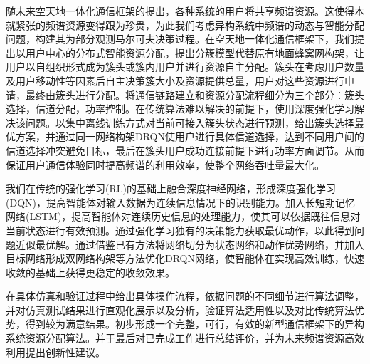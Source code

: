 \begin{cabstract}

随未来空天地一体化通信框架的提出，各种系统的用户将共享频谱资源。这使得本就紧张的频谱资源变得跟为珍贵，为此我们考虑异构系统中频谱的动态与智能分配问题，构建其为部分观测马尔可夫决策过程。在空天地一体化通信框架下，我们提出以用户中心的分布式智能资源分配，提出分簇模型代替原有地面蜂窝网构架，让用户以自组织形式成为簇头或簇内用户并进行资源自主分配。簇头在考虑用户数量及用户移动性等因素后自主决策簇大小及资源提供总量，用户对这些资源进行申请，最终由簇头进行分配。将通信链路建立和资源分配流程细分为三个部分：簇头选择，信道分配，功率控制。在传统算法难以解决的前提下，使用深度强化学习解决该问题。以集中离线训练方式对当前可接入簇头状态进行预测，给出簇头选择最优方案，并通过同一网络构架DRQN使用户进行具体信道选择，达到不同用户间的信道选择冲突避免目标，最后在簇头用户成功连接前提下进行功率方面调节。从而保证用户通信体验同时提高频谱的利用效率，使整个网络吞吐量最大化。

我们在传统的强化学习(RL)的基础上融合深度神经网络，形成深度强化学习(DQN)，提高智能体对输入数据为连续信息情况下的识别能力。加入长短期记忆网络(LSTM)，提高智能体对连续历史信息的处理能力，使其可以依据既往信息对当前状态进行有效预测。通过强化学习独有的决策能力获取最优动作，以此得到问题近似最优解。通过借鉴已有方法将网络切分为状态网络和动作优势网络，并加入目标网络形成双网络构架等方法优化DRQN网络，使智能体在实现高效训练，快速收敛的基础上获得更稳定的收敛效果。

在具体仿真和验证过程中给出具体操作流程，依据问题的不同细节进行算法调整，并对仿真测试结果进行直观化展示以及分析，验证算法适用性以及对比传统算法优势，得到较为满意结果。初步形成一个完整，可行，有效的新型通信框架下的异构系统资源分配算法。并于最后对已完成工作进行总结评价，并为未来频谱资源高效利用提出创新性建议。

\end{cabstract}

